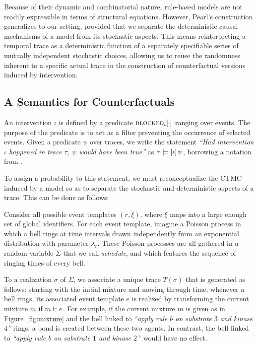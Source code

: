 Because of their dynamic and combinatorial nature, rule-based models
are not readily expressible in terms of structural equations.
However, Pearl's construction generalizes to our setting, provided
that we separate the deterministic causal mechanisms of a model from
its stochastic aspects. This means reinterpreting a temporal trace as
a deterministic function of a separately specifiable series of
mutually independent stochastic choices, allowing us to reuse the
randomness inherent to a specific actual trace in the construction of
counterfactual versions induced by intervention.

\iffalse Because of their dynamic and combinatorial nature, rule-based
models do not have structural equations that are readily available at
the outset. However, Pearl's construction generalizes to our setting,
provided that we separate the randomness of simulation from its
deterministic causal mechanisms.  \fi

\subsection{A Semantics for Counterfactuals}
\label{subsec:counterfactuals-semantics}

An intervention $\iota$ is defined by a predicate
${\textsc{blocked}}_{\iota}[\cdot]$ ranging over events. The purpose of the
predicate is to act as a filter preventing the occurrence of selected
events. Given a predicate $\psi$ over traces, we write the statement
\textit{``Had intervention $\iota$ happened in trace $\tau$, $\psi$
  would have been true''} as $\tau \models [\iota] \, \psi{}$, borrowing a notation from
\cite{halpern2016actual}.

To assign a probability to this statement, we must
reconceptualize the CTMC induced by a model so as to
separate the stochastic and deterministic aspects of a trace.
This can be done as follows:
\begin{inparaenum}[(i)]
\item Consider all possible event templates $(r, \xi)$, where $\xi$
  maps into a large enough set of global identifiers. For each event
  template, imagine a Poisson process in which a bell rings at time
  intervals drawn independently from an exponential distribution with
  parameter $\lambda_r$. These Poisson processes are all gathered in a
  random variable $\Sigma$ that we call \emph{schedule}, and which
  features the sequence of ringing times of every bell.
\item
  To a realization $\sigma$ of $\Sigma$, we associate a unique
  trace $T(\sigma)$ that is generated as follows: starting with the
  initial mixture and moving through time, whenever a bell rings, its
  associated event template $e$ is realized by transforming the
  current mixture $m$ if $m \vdash e$. For
  example, if the current mixture $m$ is given as in
  Figure~\ref{fig:mixture} and the bell linked to \textit{``apply rule
    $b$ on substrate $3$ and kinase $4$''} rings, a bond is created
  between these two agents. In contrast, the bell linked to
  \textit{``apply rule $b$ on substrate $1$ and kinase $2$'}' would
  have no effect.
\end{inparaenum}

